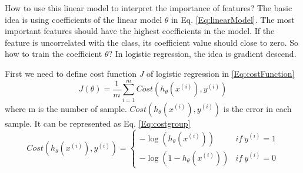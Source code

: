 How to use this linear model to interpret the importance of features? The basic idea is using coefficients of the linear model $\theta$ in Eq. \ref{Eq:linearModel}. The most important features should have the highest coefficients in the model. If the feature is uncorrelated with the class, its coefficient value should close to zero. So how to train the coefficient $\theta$? In logistic regression, the idea is gradient descend.

First we need to define cost function $J$ of logistic regression in \ref{Eq:costFunction}
\begin{equation} \label{Eq:costFunction}
J(\theta)=\frac{1}{m}\sum_{i=1}^m{Cost(h_{\theta}(x^{(i)}),y^{(i)})}
\end{equation}
where m is the number of sample. $Cost(h_{\theta}(x^{(i)}),y^{(i)})$ is the error in each sample. It can be represented as Eq. \ref{Eq:costgroup}
\begin{equation} \label{Eq:costgroup}
Cost(h_{\theta}(x^{(i)}),y^{(i)})=
\left\{
\begin{array}{rcl}
-\log{(h_{\theta}(x^{(i)}))} & if \ y^{(i)} = 1\\
-\log{(1-h_{\theta}(x^{(i)}))} & if \ y^{(i)} = 0
\end{array}
\right.
\end{equation}


